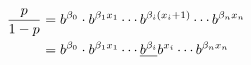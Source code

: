 \documentclass[12pt,preview,border={-3cm 0cm}]{standalone}
\DeclarePairedDelimiter{\paren}{\lparen}{\rparen}
\begin{document}
\begin{align}{}
\frac{p}{1-p} &= b^{\beta_{0}} \cdot b^{\beta_{1}x_{1}} \cdots  b^{\beta_{i}\paren{x_{i}+1}} \cdots b^{\beta_{n}x_{n}} \\
&= b^{\beta_{0}} \cdot b^{\beta_{1}x_{1}} \cdots  \underline{b^{\beta_{i}}}b^{x_{i}} \cdots b^{\beta_{n}x_{n}} \\
\end{align}
\end{document}
